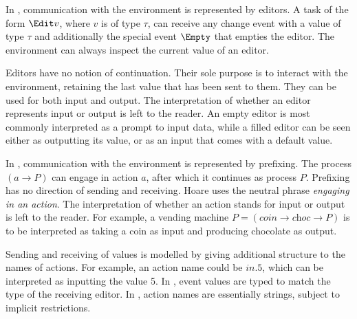 In \TOPHAT, communication with the environment is represented by editors.
A task of the form $\Edit v$, where $v$ is of type $\tau$, can receive any change event with a value of type $\tau$ and additionally the special event $\Empty$ that empties the editor.
The environment can always inspect the current value of an editor.

Editors have no notion of continuation.
Their sole purpose is to interact with the environment, retaining the last value that has been sent to them.
%
They can be used for both input and output.
The interpretation of whether an editor represents input or output is left to the reader.
An empty editor is most commonly interpreted as a prompt to input data, while a filled editor can be seen either as outputting its value, or as an input that comes with a default value.

In \CSP, communication with the environment is represented by prefixing.
The process $(a \to P)$ can engage in action $a$, after which it continues as process $P$.
%
Prefixing has no direction of sending and receiving.
Hoare uses the neutral phrase \emph{engaging in an action}.
The interpretation of whether an action stands for input or output is left to the reader.
For example, a vending machine $P = (\textit{coin} \to \textit{choc} \to P)$ is to be interpreted as taking a coin as input and producing chocolate as output.

Sending and receiving of values is modelled by giving additional structure to the names of actions.
For example, an action name could be $\textit{in}.5$, which can be interpreted as inputting the value 5.
%
In \TOP, event values are typed to match the type of the receiving editor.
In \CSP, action names are essentially strings, subject to implicit restrictions.



